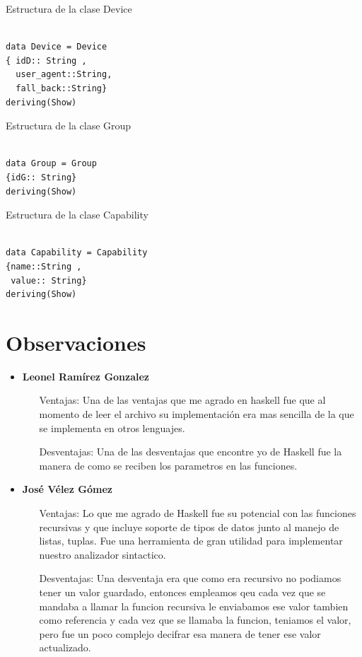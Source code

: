 \documentclass[a4paper,openright,12pt]{report}
\begin{document}
\lstset{language=Haskell}          %
Estructura de la clase Device
\begin{lstlisting}[frame=single]  % Start your code-block

data Device = Device 
{ idD:: String ,	
  user_agent::String,	
  fall_back::String}
deriving(Show)
\end{lstlisting}
Estructura de la clase Group
\begin{lstlisting}[frame=single]  % Start your code-block

data Group = Group 
{idG:: String}
deriving(Show)
\end{lstlisting}
Estructura de la clase Capability
\begin{lstlisting}[frame=single]  % Start your code-block

data Capability = Capability 
{name::String ,
 value:: String}
deriving(Show)
\end{lstlisting}


\chapter{Observaciones}
\begin{itemize}
\item \textbf{Leonel Ramírez Gonzalez}
\begin{itemize}
	\item[Ventajas: ]Una de las ventajas que me agrado en haskell fue que al momento de leer el archivo su implementación era mas sencilla de la que se implementa en otros lenguajes.
	\item[Desventajas: ]Una de las desventajas que encontre yo de Haskell fue la manera de como se reciben los parametros en las funciones.
\end{itemize}
\item \textbf{José Vélez Gómez}
\begin{itemize}
	\item[Ventajas: ] Lo que me agrado de Haskell fue su potencial con las funciones recursivas y que incluye soporte de tipos de datos junto al manejo de listas, tuplas. Fue una herramienta de gran utilidad para implementar nuestro analizador sintactico.
	\item[Desventajas: ]Una desventaja era que como era recursivo no podiamos tener un valor guardado, entonces empleamos qeu cada vez que se mandaba a llamar la funcion recursiva le enviabamos ese valor tambien como referencia y cada vez que se llamaba la funcion, teniamos el valor, pero fue un poco complejo decifrar esa manera de tener ese valor actualizado.
\end{itemize}
\end{itemize}
\end{document}
